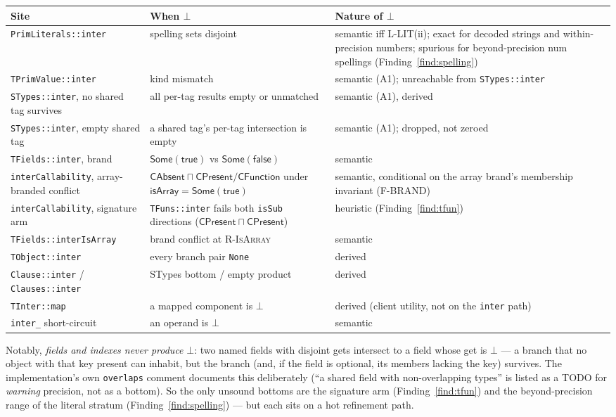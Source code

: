 \documentclass[11pt]{article}
\begin{document}
\begin{center}
\renewcommand{\arraystretch}{1.25}
\small
\begin{tabular}{@{}p{4.9cm}p{5.6cm}p{3.4cm}@{}}
\toprule
\textbf{Site} & \textbf{When $\bot$} & \textbf{Nature of $\bot$} \\
\midrule
\texttt{PrimLiterals::inter} & spelling sets disjoint &
  semantic iff L-LIT(ii); exact for decoded strings and
  within-precision numbers; spurious for beyond-precision num
  spellings (Finding~\ref{find:spelling}) \\
\texttt{TPrimValue::inter} & kind mismatch & semantic (A1); unreachable
  from \texttt{STypes::inter} \\
\texttt{STypes::inter}, no shared tag survives & all per-tag results
  empty or unmatched & semantic (A1), derived \\
\texttt{STypes::inter}, empty shared tag & a shared tag's per-tag
  intersection is empty & semantic (A1); dropped, not zeroed \\
\texttt{TFields::inter}, brand & $\mathsf{Some}(\mathsf{true})$ vs
  $\mathsf{Some}(\mathsf{false})$ & semantic \\
\texttt{interCallability}, array-branded conflict &
  $\mathsf{CAbsent} \sqcap \mathsf{CPresent}/\mathsf{CFunction}$ under
  $\mathsf{isArray} = \mathsf{Some(true)}$ & semantic, conditional on
  the array brand's membership invariant (F-BRAND) \\
\texttt{interCallability}, signature arm & \texttt{TFuns::inter} fails
  both \texttt{isSub} directions
  ($\mathsf{CPresent} \sqcap \mathsf{CPresent}$) & heuristic
  (Finding~\ref{find:tfun}) \\
\texttt{TFields::interIsArray} & brand conflict at \textsc{R-IsArray} &
  semantic \\
\texttt{TObject::inter} & every branch pair \texttt{None} & derived \\
\texttt{Clause::inter} / \texttt{Clauses::inter} & STypes bottom /
  empty product & derived \\
\texttt{TInter::map} & a mapped component is $\bot$ & derived (client
  utility, not on the \texttt{inter} path) \\
\texttt{inter\_} short-circuit & an operand is $\bot$ & semantic \\
\bottomrule
\end{tabular}
\end{center}

\noindent
Notably, \emph{fields and indexes never produce} $\bot$: two named
fields with disjoint gets intersect to a field whose get is $\bot$ —
a branch that no object with that key present can inhabit, but the
branch (and, if the field is optional, its members lacking the key)
survives. The implementation's own \texttt{overlaps} comment documents
this deliberately (``a shared field with non-overlapping types'' is
listed as a TODO for \emph{warning} precision, not as a bottom). So the
only unsound bottoms are the signature arm
(Finding~\ref{find:tfun}) and the beyond-precision range of the
literal stratum (Finding~\ref{find:spelling}) — but each sits on a hot
refinement path.
\end{document}
